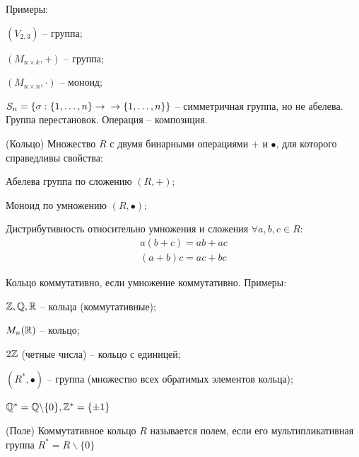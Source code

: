 \begin{multicols}{2}
\begin{note}
\end{note}
Примеры:
\begin{multicols}{2}
\begin{enumerate*}
    \item $(V_{2,3})$ -- группа;
    \item $(M_{n\times k}, +)$ -- группа;
    \item $(M_{n\times n}, \cdot)$ -- моноид;
    \item $S_n = \{\sigma: \{1, \ldots, n\} \to \\ \to \{1, \ldots, n\}\}$ -- симметричная группа, но не абелева. Группа перестановок. Операция -- композиция. 
\end{enumerate*}
\end{multicols}
\begin{definition}{(Кольцо)}{}
    Множество $R$ с двумя бинарными операциями $+$ и $\bullet$, для которого справедливы свойства:
    \begin{enumerate*}
        \item Абелева группа по сложению $(R, +)$;
        \item Моноид по умножению $(R, \bullet)$;
        \item Дистрибутивность относительно умножения и сложения $\forall a,b,c \in R$:
        \[
            \begin{array}{c}
                a(b+c) = ab+ac\\
                (a+b)c = ac+bc
            \end{array}
        \]  
    \end{enumerate*} 
\end{definition}
Кольцо коммутативно, если умножение коммутативно.
Примеры:
\begin{multicols}{2}
    \begin{enumerate*}
        \item $\mathbb{Z}, \mathbb{Q}, \mathbb{R}$ -- кольца (коммутативные);
        \item $M_n(\mathbb{R})$ -- кольцо;
        \item $2\mathbb{Z}$ (четные числа) -- кольцо с единицей;
        \item $(R^{*}, \bullet)$ -- группа (множество всех обратимых элементов кольца);
        \item $\mathbb{Q}^*=\mathbb{Q}\backslash\{0\}, \mathbb{Z}^* = \{\pm 1\}$
    \end{enumerate*}
\end{multicols}
\begin{definition}{(Поле)}{}
    Коммутативное кольцо $R$ называется полем, если его мультипликативная группа \mbox{$R^* = R\backslash \{0\}$}

\end{definition}
\end{multicols}
